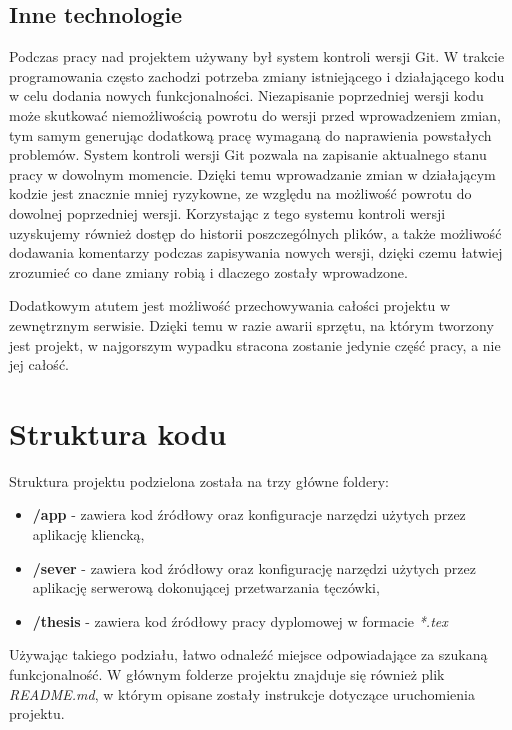\subsection{Inne technologie}

Podczas pracy nad projektem używany był system kontroli wersji Git. W trakcie programowania
często zachodzi potrzeba zmiany istniejącego i działającego kodu w celu dodania nowych funkcjonalności.
Niezapisanie poprzedniej wersji kodu może skutkowa\'c niemożliwością powrotu do wersji przed
wprowadzeniem zmian, tym samym generując dodatkową pracę wymaganą do naprawienia powstałych
problemów. System kontroli wersji Git pozwala na zapisanie aktualnego stanu pracy w dowolnym momencie.
Dzięki temu wprowadzanie zmian w działającym kodzie jest znacznie mniej ryzykowne, ze względu na
możliwoś\'c powrotu do dowolnej poprzedniej wersji. Korzystając z tego systemu kontroli wersji uzyskujemy
również dostęp do historii poszczególnych plików, a także możliwoś\'c dodawania komentarzy podczas zapisywania nowych wersji,
dzięki czemu łatwiej zrozumie\'c co dane zmiany robią i dlaczego zostały wprowadzone.

Dodatkowym atutem jest możliwoś\'c przechowywania całości projektu w zewnętrznym serwisie. Dzięki
temu w razie awarii sprzętu, na którym tworzony jest projekt, w najgorszym wypadku stracona
zostanie jedynie częś\'c pracy, a nie jej całoś\'c.

\section{Struktura kodu}

Struktura projektu podzielona została na trzy główne foldery:

\begin{itemize}
  \item \textbf{/app} - zawiera kod \'zródłowy oraz konfiguracje narzędzi użytych przez aplikację
  kliencką,
  \item \textbf{/sever} - zawiera kod \'zródłowy oraz konfigurację narzędzi użytych przez aplikację
  serwerową dokonującej przetwarzania tęczówki,
  \item \textbf{/thesis} - zawiera kod \'zródłowy pracy dyplomowej w formacie \textit{*.tex}
\end{itemize}

Używając takiego podziału, łatwo odnale\'z\'c miejsce odpowiadające za szukaną funkcjonalnoś\'c.
W głównym folderze projektu znajduje się również plik \textit{README.md}, w którym opisane zostały
instrukcje dotyczące uruchomienia projektu.

